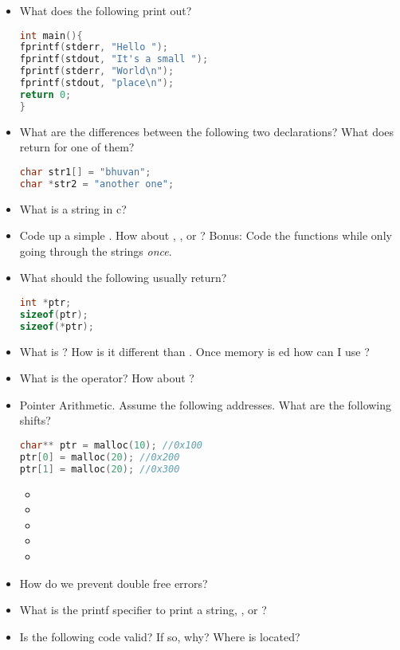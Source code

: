 \begin{itemize}
	\item
	      What does the following print out?

	      \begin{lstlisting}[language=C]
int main(){
fprintf(stderr, "Hello ");
fprintf(stdout, "It's a small ");
fprintf(stderr, "World\n");
fprintf(stdout, "place\n");
return 0;
}
\end{lstlisting}
	\item
	      What are the differences between the following two declarations? What
	      does  return for one of them?

	      \begin{lstlisting}[language=C]
char str1[] = "bhuvan";
char *str2 = "another one";
\end{lstlisting}
	\item
	      What is a string in c?
	\item
	      Code up a simple . How about , , or ? Bonus: Code the functions while only going through the strings \emph{once}.
	\item
	      What should the following usually return?

	      \begin{lstlisting}[language=C]
int *ptr;
sizeof(ptr);
sizeof(*ptr);
\end{lstlisting}
	\item
	      What is ? How is it different than . Once memory is ed how can I use ?
	\item
	      What is the \keyword{\&} operator? How about \keyword{*}?
	\item
	      Pointer Arithmetic. Assume the following addresses. What are the following shifts?

	      \begin{lstlisting}[language=C]
char** ptr = malloc(10); //0x100
ptr[0] = malloc(20); //0x200
ptr[1] = malloc(20); //0x300
\end{lstlisting}

	      \begin{itemize}
		      \tightlist
		      \item
		      \item
		      \item
		      \item
		      \item
	      \end{itemize}
	\item
	      How do we prevent double free errors?
	\item
	      What is the printf specifier to print a string, , or
	      ?
	\item
	      Is the following code valid? If so, why? Where is 
	      located?


\end{itemize}

